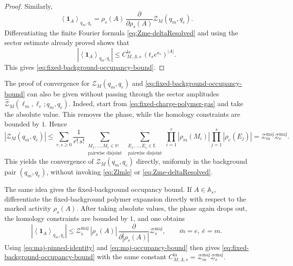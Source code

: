 \begin{proof}
	Similarly,
	\begin{equation}
		\left\langle \mathbf 1_A \right\rangle_{q_m,q_e}
		=
		\rho_s(A)\,
		\frac{\partial}{\partial \rho_s(A)}
		\mathcal Z_M(q_m,q_e).
	\end{equation}
	Differentiating the finite Fourier formula \eqref{eq:Zme-deltaResolved} and using the
	sector estimate already proved shows that
	\begin{equation}
		\left|
		\left\langle \mathbf 1_A \right\rangle_{q_m,q_e}
		\right|
		\le
		C_{M,\underline\Lambda,s}^{\mathrm{la}}\,(t_s e^{a_s})^{|A|}.
	\end{equation}
	This gives \eqref{eq:fixed-background-occupancy-bound}.
\end{proof}

\begin{remark}\label{rmk:directZmeBound}
	The proof of convergence for $\mathcal Z_M(q_m,q_e)$ and \eqref{eq:fixed-background-occupancy-bound}
	can also be given without passing through the sector amplitudes
	\(\widehat{\mathcal Z}_M(\ell_m,\ell_e;q_m,q_e)\).  Indeed, start from \eqref{eq:fixed-charge-polymer-gas} and take the absolute value. This removes the phase,
	while the homology constraints are bounded by \(1\). Hence
	\begin{equation}
		|\mathcal Z_M(q_m,q_e)|
		\le
		\sum_{r,s\ge 0}
		\frac{1}{r!\,s!}
		\sum_{\substack{M_1,\dots,M_r\in \mathbb M\\ \text{pairwise disjoint}}}
		\sum_{\substack{E_1,\dots,E_s\in \mathbb E\\ \text{pairwise disjoint}}}
		\prod_{i=1}^r |\rho_m(M_i)|
		\prod_{j=1}^s |\rho_e(E_j)|
		=
		\mathcal Z_m^{\mathrm{maj}}\mathcal Z_e^{\mathrm{maj}}.
	\end{equation}
	This yields the convergence of \(\mathcal Z_M(q_m,q_e)\) directly, uniformly in the
	background pair \((q_m,q_e)\), without invoking \eqref{eq:Zlmle} or
	\eqref{eq:Zme-deltaResolved}.
	
	The same idea gives the fixed-background occupancy bound. If \(A\in\mathbb A_s\),
	differentiate the fixed-background polymer expansion directly with respect to the
	marked activity \(\rho_s(A)\). After taking absolute values, the phase again drops
	out, the homology constraints are bounded by \(1\), and one obtains
	\begin{equation}
		\left|
		\left\langle \mathbf 1_A \right\rangle_{q_m,q_e}
		\right|
		\le
		\mathcal Z_{\bar s}^{\mathrm{maj}}\,
		|\rho_s(A)|\,
		\frac{\partial}{\partial |\rho_s(A)|}\mathcal Z_s^{\mathrm{maj}},
		\qquad
		\bar m=e,\ \bar e=m.
	\end{equation}
	Using \eqref{eq:maj-pinned-identity} and \eqref{eq:maj-occupancy-bound} then gives
	\eqref{eq:fixed-background-occupancy-bound} with the same constant
	\(C_{M,\underline\Lambda,s}^{\mathrm{la}}
	=\mathcal Z_m^{\mathrm{maj}}\mathcal Z_e^{\mathrm{maj}}\).
\end{remark}





